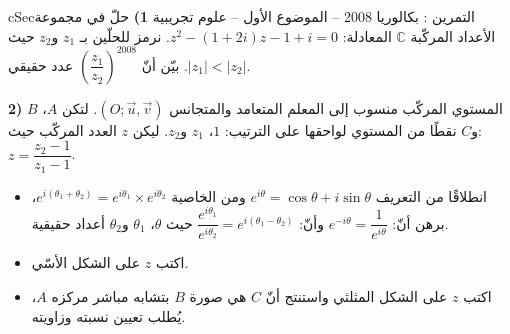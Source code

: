 \documentclass[12pt,a4paper]{article}
\newenvironment{BOX}[2]{\begin{otherlanguage}{english}\begin{arbox}{#1}{#2}}{\end{arbox}\end{otherlanguage}}
\newcounter{exo}
\newenvironment{tamrin}[1]{\stepcounter{exo}\begin{BOX}{cSec}{التمرين \theexo: #1}}{\end{BOX}}
\newenvironment{sq}{\begin{itemize}[leftmargin=2.4em,itemsep=3pt]}{\end{itemize}}
\newcommand{\qa}{\item[(أ)]}\newcommand{\qb}{\item[(ب)]}\newcommand{\qc}{\item[(جـ)]}\newcommand{\qd}{\item[(د)]}\newcommand{\qe}{\item[(هـ)]}
\begin{document}
\begin{tamrin}{بكالوريا 2008 -- الموضوع الأول -- علوم تجريبية}
\textbf{1)} حلّ في مجموعة الأعداد المركّبة $\mathbb{C}$ المعادلة: $z^2-(1+2i)z-1+i=0$.
نرمز للحلّين بـ $z_1$ و$z_2$ حيث $|z_1|<|z_2|$. بيّن أنّ $\left(\dfrac{z_1}{z_2}\right)^{2008}$ عدد حقيقي.

\textbf{2)} المستوي المركّب منسوب إلى المعلم المتعامد والمتجانس $(O;\vec u,\vec v)$.
لتكن $A$، $B$ و$C$ نقطًا من المستوي لواحقها على الترتيب: $1$، $z_1$ و$z_2$. ليكن $z$ العدد المركّب حيث: $z=\dfrac{z_2-1}{z_1-1}$.
\begin{sq}
\qa انطلاقًا من التعريف $e^{i\theta}=\cos\theta+i\sin\theta$ ومن الخاصية $e^{i(\theta_1+\theta_2)}=e^{i\theta_1}\times e^{i\theta_2}$،
برهن أنّ: $e^{-i\theta}=\dfrac{1}{e^{i\theta}}$ وأنّ: $\dfrac{e^{i\theta_1}}{e^{i\theta_2}}=e^{i(\theta_1-\theta_2)}$ حيث $\theta$، $\theta_1$ و$\theta_2$ أعداد حقيقية.
\qb اكتب $z$ على الشكل الأسّي.
\qc اكتب $z$ على الشكل المثلثي واستنتج أنّ $C$ هي صورة $B$ بتشابه مباشر مركزه $A$، يُطلب تعيين نسبته وزاويته.
\end{sq}
\end{tamrin}
\end{document}
